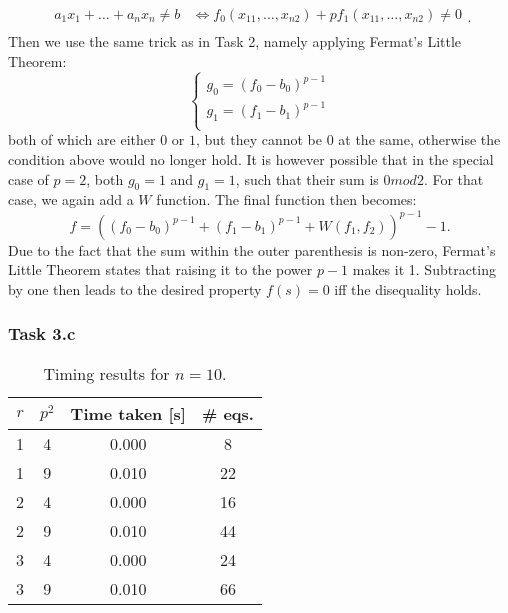 \documentclass{article}
\begin{document}
\begin{equation}
  \begin{split}
    a_1 x_1 + \dots + a_n x_n \neq b &\Leftrightarrow f_0(x_{11}, 
    \dots, x_{n 2}) + p f_1(x_{11}, 
    \dots, x_{n 2}) 
    \neq 0 \\
  \end{split}.
\end{equation} 
Then we use the same trick as in Task 2, namely applying Fermat's Little
Theorem:
\begin{equation}
\begin{cases}
  g_0 = (f_0 - b_0)^{p - 1} \\
  g_1 = (f_1 - b_1)^{p - 1} \\
\end{cases}
\end{equation} 
both of which are either $0$ or $1$, but they cannot be 0 at the same, otherwise
the condition above would no longer hold. It is however possible that in the
special case of $p = 2$, both $g_0 = 1$ and $g_1 = 1$, such that their sum is $0
mod 2$. For that case, we again add a $W$ function. The final function then
becomes:
\begin{equation}
  f = \left( (f_0 - b_0)^{p - 1} + (f_1 - b_1)^{p-1} + W(f_1, f_2)
  \right)^{p-1} - 1.
\end{equation} 
Due to the fact that the sum within the outer parenthesis is non-zero, Fermat's
Little Theorem states that raising it to the power $p - 1$ makes it 1.
Subtracting by one then leads to the desired property  $f(s) = 0$ iff the
disequality holds.

\subsubsection*{Task 3.c}

\begin{table}[htpb]
  \centering
  \caption{Timing results for $n = 10$.}
  \label{tab:label}
  \begin{tabular}{cccc}
  
    \toprule
    $r$ & $p^2$ & Time taken [s]  & \# eqs.\\
    \midrule
    1 & 4 & 0.000 & 8\\
    \midrule
    1 & 9 & 0.010 & 22\\
    \midrule
    2 & 4 & 0.000 & 16 \\
    \midrule
    2 & 9 & 0.010 & 44 \\
    \midrule
    3 & 4 & 0.000 & 24\\
    \midrule
    3 & 9 & 0.010 & 66 \\
    \bottomrule
  \end{tabular}
\end{table}
\end{document}

